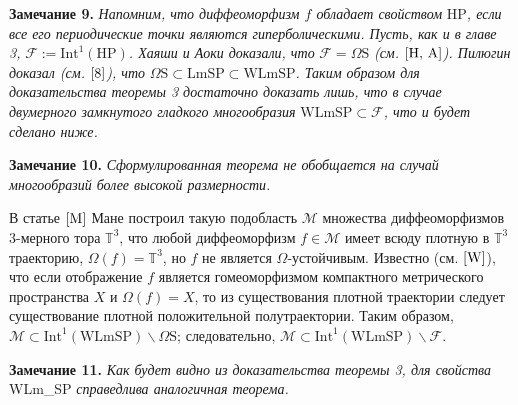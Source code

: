 \documentclass[12pt]{article}
\begin{document}
\textbf{Замечание 9.} \textit{Напомним, что диффеоморфизм $f$ обладает свойством} HP\textit{, если все его периодические точки являются гиперболическими. Пусть, как и в главе 3,} $\mathcal F:=\mbox{Int}^1(\mbox{HP})$\textit{.
Хаяши и Аоки доказали, что }$\mathcal F\!=\!\Omega \mbox{S}$ \textit{(см. $\cite{H, A}$). 
Пилюгин доказал (см. $\cite{8}$), что} $\Omega\mbox{S}\!\subset\!\mbox{LmSP}\!\subset\!\mbox{WLmSP}$\textit{. Таким образом для доказательства теоремы 3 достаточно доказать лишь, что в случае двумерного замкнутого гладкого многообразия} $\mbox{WLmSP}\subset\mathcal{F}$\textit{, что и будет сделано ниже. 
}

\textbf{Замечание 10.}
\textit{Сформулированная теорема не обобщается на случай многообразий более высокой размерности. }

В статье $\cite{M}$ Мане построил такую подобласть $\mathcal M$ множества диффеоморфизмов 3-мерного тора $\mathbb{T}^3$, что любой диффеоморфизм $f\!\in\! \mathcal M$ имеет всюду плотную в $\mathbb{T}^3$ траекторию, $\Omega(f)=\mathbb{T}^3$, но $f$ не является $\Omega$-устойчивым. Известно (см. $\cite{W}$), что если отображение $f$ является гомеоморфизмом компактного метрического пространства $X$ и $\Omega(f)=X$, то из существования плотной траектории следует существование плотной положительной полутраектории. Таким образом, $\mathcal M\subset\mbox{Int}^1(\mbox{WLmSP})\backslash\Omega\mbox{S}$; следовательно, $\mathcal M\subset\mbox{Int}^1(\mbox{WLmSP})\backslash\mathcal F$.  

\textbf{Замечание 11.}
\textit{
Как будет видно из доказательства теоремы 3, для свойства} WLm\_SP \textit{справедлива аналогичная теорема.}
\end{document}
